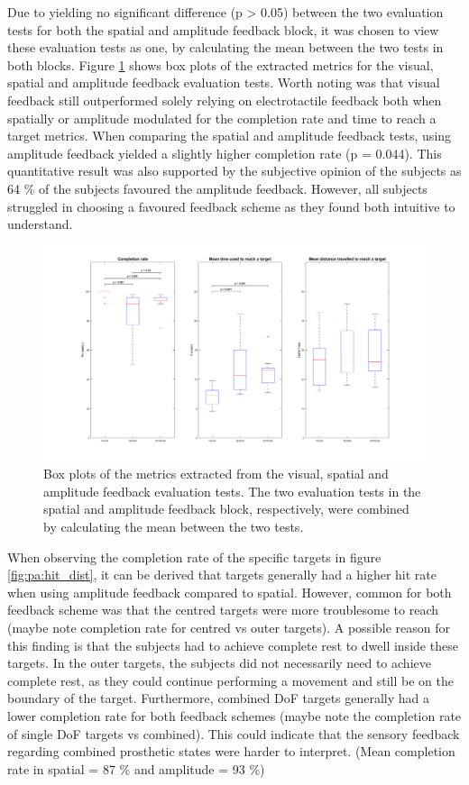 Due to yielding no significant difference (p > 0.05) between the two evaluation tests for both the spatial and amplitude feedback block, it was chosen to view these evaluation tests as one, by calculating the mean between the two tests in both blocks. Figure \ref{fig:pa:boxplot_results} shows box plots of the extracted metrics for the visual, spatial and amplitude feedback evaluation tests. Worth noting was that visual feedback still outperformed solely relying on electrotactile feedback both when spatially or amplitude modulated for the completion rate and time to reach a target metrics. When comparing the spatial and amplitude feedback tests, using amplitude feedback yielded a slightly higher completion rate (p = 0.044). This quantitative result was also supported by the subjective opinion of the subjects as 64 \% of the subjects favoured the amplitude feedback. However, all subjects struggled in choosing a favoured feedback scheme as they found both intuitive to understand. 

\begin{figure}[H]                 
	\includegraphics[width=1\textwidth]{figures/boxplot_results}
	\caption{Box plots of the metrics extracted from the visual, spatial and amplitude feedback evaluation tests. The two evaluation tests in the spatial and amplitude feedback block, respectively, were combined by calculating the mean between the two tests.}
	\label{fig:pa:boxplot_results} 
\end{figure}

When observing the completion rate of the specific targets in figure \ref{fig:pa:hit_dist}, it can be derived that targets generally had a higher hit rate when using amplitude feedback compared to spatial. However, common for both feedback scheme was that the centred targets were more troublesome to reach (maybe note completion rate for centred vs outer targets). A possible reason for this finding is that the subjects had to achieve complete rest to dwell inside these targets. In the outer targets, the subjects did not necessarily need to achieve complete rest, as they could continue performing a movement and still be on the boundary of the target. Furthermore, combined DoF targets generally had a lower completion rate for both feedback schemes (maybe note the completion rate of single DoF targets vs combined). This could indicate that the sensory feedback regarding combined prosthetic states were harder to interpret. (Mean completion rate in spatial = 87 \% and amplitude = 93 \%)

